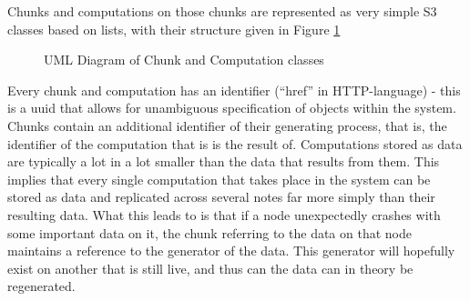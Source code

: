 Chunks and computations on those chunks are represented as very simple S3 classes based on lists, with their structure given in Figure \cref{fig:largerscale}

\begin{figure}

\caption{UML Diagram of Chunk and Computation classes}
\label{fig:largerscale}
\end{figure}

Every chunk and computation has an identifier (``href'' in HTTP-language) - this is a uuid that allows for unambiguous specification of objects within the system.
Chunks contain an additional identifier of their generating process, that is, the identifier of the computation that is is the result of.
Computations stored as data are typically a lot in a lot smaller than the data that results from them.
This implies that every single computation that takes place in the system can be stored as data and replicated across several notes far more simply than their resulting data.
What this leads to is that if a node unexpectedly crashes with some important data on it, the chunk referring to the data on that node maintains a reference to the generator of the data.
This generator will hopefully exist on another that is still live, and thus can the data can in theory be regenerated.

